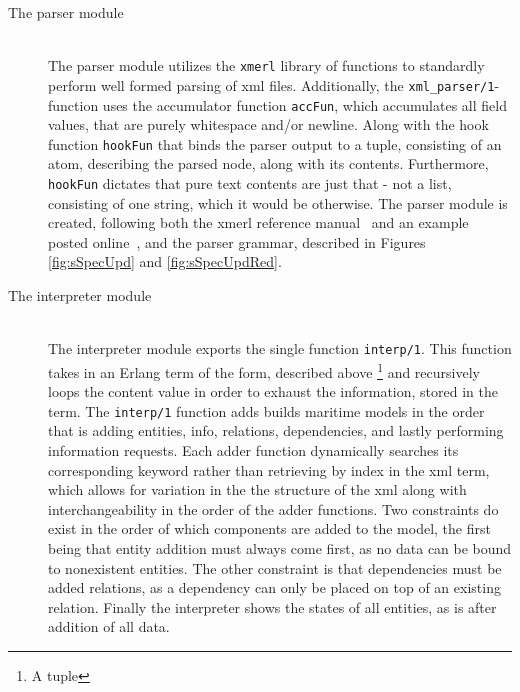 \begin{description}
	\item[The parser module]\ \\
		The parser module utilizes the \lstinline{xmerl} library of functions to standardly perform well formed parsing of xml files. Additionally, the \lstinline{xml_parser/1}-function uses the accumulator function \lstinline{accFun}, which accumulates all field values, that are  purely whitespace and/or newline. Along with the hook function \lstinline{hookFun} that binds the parser output to a tuple, consisting of an atom, describing the parsed node, along with its contents. Furthermore, \lstinline{hookFun} dictates that pure text contents are just that - not a list, consisting of one string, which it would be otherwise. The parser module is created, following both the xmerl reference manual~\cite{xmerl} and an example posted online~\cite{xmerlEx}, and the parser grammar, described in Figures \ref{fig:sSpecUpd} and \ref{fig:sSpecUpdRed}.
	\item[The interpreter module]\ \\
		The interpreter module exports the single function \lstinline{interp/1}. This function takes in an Erlang term of the form, described above \footnote{A tuple} and recursively loops the content value in order to exhaust the information, stored in the term. The \lstinline{interp/1} function adds builds maritime models in the order that is adding entities, info, relations, dependencies, and lastly performing information requests. Each adder function dynamically searches its corresponding keyword rather than retrieving by index in the xml term, which allows for variation in the the structure of the xml along with interchangeability in the order of the adder functions. Two constraints do exist in the order of which components are added to the model, the first being that entity addition must always come first, as no data can be bound to nonexistent entities. The other constraint is that dependencies must be added  relations, as a dependency can only be placed on top of an existing relation. Finally the interpreter shows the states of all entities, as is after addition of all data.
\end{description}
